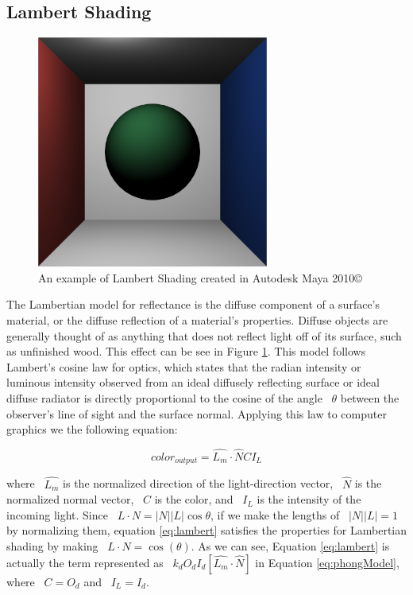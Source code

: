 \subsection{Lambert Shading}
\label{subsec: Lambert Shading}
\begin{figure}[h]
\centering
\includegraphics[height=3.0in]{figures/lambert_Maya.png}
\caption{An example of Lambert Shading created in Autodesk Maya 2010\copyright}
\label{fig:lambertmaya}
\end{figure}
The Lambertian model for reflectance is the diffuse component of a surface's material, or the diffuse reflection of a material's properties.  Diffuse objects are generally thought of as anything that does not reflect light off of its surface, such as unfinished wood.  This effect can be see in Figure \ref{fig:lambertmaya}. This model follows Lambert's cosine law for optics, which states that the radian intensity or luminous intensity observed from an ideal diffusely reflecting surface or ideal diffuse radiator is directly proportional to the cosine of the angle ~$\theta$ between the observer's line of sight and the surface normal.  Applying this law to computer graphics we the following equation:

\begin{equation}
\label{eq:lambert}
color_{output} = \hat{L_{m}} \cdot \hat{N} CI_{L}
\end{equation}

where ~$\hat{L_{m}}$ is the normalized direction of the light-direction vector, ~$\hat{N}$ is the normalized normal vector, ~$C$ is the color, and ~$I_{L}$ is the intensity of the incoming light.  Since ~$L \cdot N =  |N||L|\cos{\theta}$, if we make the lengths of ~$|N||L| = 1$ by normalizing them, equation \ref{eq:lambert} satisfies the properties for Lambertian shading by making ~$L \cdot N = \cos(\theta)$.  As we can see, Equation \ref{eq:lambert} is actually the term represented as ~$k_{d}O_{d}I_{d}[\hat{L_{m}} \cdot \hat{N}]$ in Equation \ref{eq:phongModel}, where ~$C = O_{d}$ and ~$I_{L} = I_{d}$.

